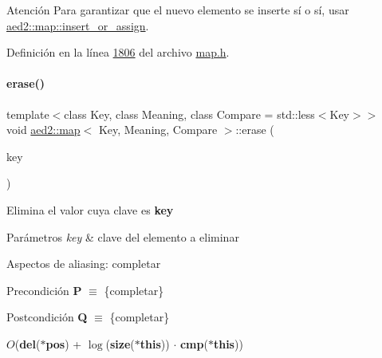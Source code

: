 \begin{DoxyAttention}{Atención}
Para garantizar que el nuevo elemento se inserte sí o sí, usar \hyperlink{classaed2_1_1map_a2ef6723c183916276b0afc4a4c721475_a2ef6723c183916276b0afc4a4c721475}{aed2\+::map\+::insert\+\_\+or\+\_\+assign}. 
\end{DoxyAttention}


Definición en la línea \hyperlink{map_8h_source_l01806}{1806} del archivo \hyperlink{map_8h_source}{map.\+h}.

\mbox{\label{classaed2_1_1map_a2ffadb42cd5f0bc7b3752ff159b75334_a2ffadb42cd5f0bc7b3752ff159b75334}} 
\paragraph{\texorpdfstring{erase()}{erase()}\hspace{0.1cm}{\footnotesize\ttfamily [2/2]}}
{\footnotesize\ttfamily template$<$class Key, class Meaning, class Compare = std\+::less$<$\+Key$>$$>$ \\
void \hyperlink{classaed2_1_1map}{aed2\+::map}$<$ Key, Meaning, Compare $>$\+::erase (\begin{DoxyParamCaption}\item[{const Key \&}]{key }\end{DoxyParamCaption})\hspace{0.3cm}{\ttfamily [inline]}}



Elimina el valor cuya clave es {\bfseries key} 


\begin{DoxyParams}{Parámetros}
{\em key} & clave del elemento a eliminar\\
\hline
\end{DoxyParams}
\begin{DoxyParagraph}{Aspectos de aliasing\+:}
completar
\end{DoxyParagraph}
\begin{DoxyPrecond}{Precondición}
{\bfseries P} $\equiv$ \{completar\} 
\end{DoxyPrecond}
\begin{DoxyPostcond}{Postcondición}
{\bfseries Q} $\equiv$ \{completar\}
\end{DoxyPostcond}

\begin{DoxyDescription}
\item[Complejidad Temporal]$O$({\bfseries del}({\bfseries $\ast$pos}) + $\log$({\bfseries size}({\bfseries $\ast$this})) $\cdot$ {\bfseries cmp}({\bfseries $\ast$this}))
\end{DoxyDescription}

